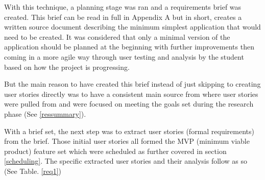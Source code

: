 With this technique, a planning stage was ran and a requirements brief was created. This brief can be read in full in Appendix A but in short, creates a written source document describing the minimum simplest application that would need to be created. It was considered that only a minimal version of the application should be planned at the beginning with further improvements then coming in a more agile way through user testing and analysis by the student based on how the project is progressing.

But the main reason to have created this brief instead of just skipping to creating user stories directly was to have a consistent main source from where user stories were pulled from and were focused on meeting the goals set during the research phase (See \ref{ressummary}).

With a brief set, the next step was to extract user stories (formal requirements) from the brief. Those initial user stories all formed the MVP (minimum viable product) feature set which were scheduled as further covered in section \ref{scheduling}. The specific extracted user stories and their analysis follow as so (See Table. \ref{req1})

